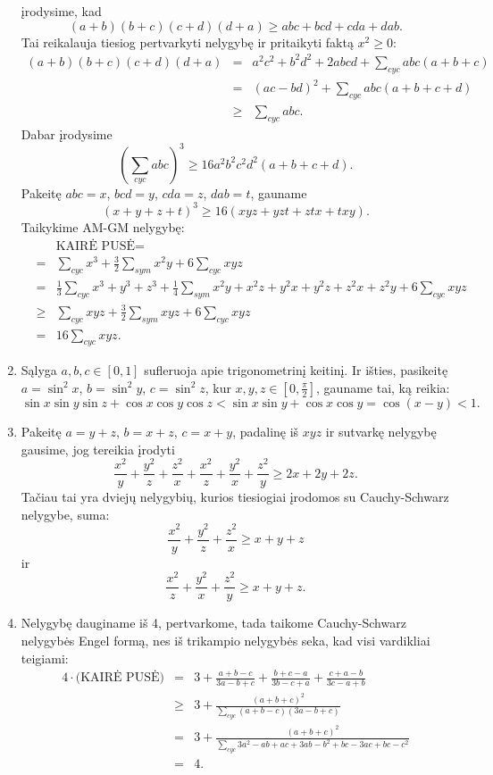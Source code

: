 \begin{enumerate}
įrodysime, kad $$(a+b)(b+c)(c+d)(d+a)\geq abc+bcd+cda+dab.$$ Tai
reikalauja tiesiog pertvarkyti nelygybę ir pritaikyti faktą
$x^2\geq0$:
\begin{eqnarray*}(a+b)(b+c)(c+d)(d+a)&=&a^2c^2+b^2d^2+2abcd+\sum_{cyc}{abc(a+b+c)}\\
&=&(ac-bd)^2+\sum_{cyc}{abc(a+b+c+d)}\\&\geq&\sum_{cyc}{abc}.\end{eqnarray*}
Dabar įrodysime
$$\left(\sum_{cyc}{abc}\right)^3\geq16a^2b^2c^2d^2(a+b+c+d).$$ Pakeitę
$abc=x$, $bcd=y$, $cda=z$, $dab=t$, gauname
$$(x+y+z+t)^3\geq16(xyz+yzt+ztx+txy).$$ Taikykime AM-GM nelygybę: \begin{eqnarray*}&&\text{KAIRĖ
PUSĖ}=\\&=&\sum_{cyc}{x^3}+\frac{3}{2}\sum_{sym}{x^2y}+6\sum_{cyc}{xyz}\\
&=&\frac{1}{3}\sum_{cyc}{x^3+y^3+z^3}+\frac{1}{4}\sum_{sym}{x^2y+x^2z+y^2x+y^2z+z^2x+z^2y}+6\sum_{cyc}{xyz}\\
&\geq&\sum_{cyc}{xyz}+\frac{3}{2}\sum_{sym}{xyz}+6\sum_{cyc}{xyz}\\&=&16\sum_{cyc}{xyz}.\end{eqnarray*}
\item 
Sąlyga $a,b,c\in[0,1]$ sufleruoja apie trigonometrinį keitinį. Ir
išties, pasikeitę $a=\sin^2x$, $b=\sin^2y$, $c=\sin^2z$, kur
$x,y,z\in[0,\frac{\pi}{2}]$, gauname tai, ką reikia: $$\sin x\sin
y\sin z+\cos x\cos y\cos z<\sin x\sin y+\cos x\cos y=\cos(x-y)<1.$$
\item 
Pakeitę $a=y+z$, $b=x+z$, $c=x+y$, padalinę iš $xyz$ ir sutvarkę
nelygybę gausime, jog tereikia įrodyti
$$\frac{x^2}{y}+\frac{y^2}{z}+\frac{z^2}{x}+\frac{x^2}{z}+\frac{y^2}{x}+\frac{z^2}{y}\geq
2x+2y+2z.$$ Tačiau tai yra dviejų nelygybių, kurios tiesiogiai
įrodomos su Cauchy-Schwarz nelygybe, suma:
$$\frac{x^2}{y}+\frac{y^2}{z}+\frac{z^2}{x}\geq x+y+z$$ ir
$$\frac{x^2}{z}+\frac{y^2}{x}+\frac{z^2}{y}\geq x+y+z.$$
\item 
Nelygybę dauginame iš 4, pertvarkome, tada taikome Cauchy-Schwarz
nelygybės Engel formą, nes iš trikampio nelygybės seka, kad visi
vardikliai teigiami: \begin{eqnarray*}4\cdot\text{(KAIRĖ
PUSĖ)}&=&3+\frac{a+b-c}{3a-b+c}+\frac{b+c-a}{3b-c+a}+\frac{c+a-b}{3c-a+b}\\
&\geq&3+\frac{(a+b+c)^2}{\sum\limits_{cyc}{(a+b-c)(3a-b+c)}}\\
&=&3+\frac{(a+b+c)^2}{\sum\limits_{cyc}{3a^2-ab+ac+3ab-b^2+bc-3ac+bc-c^2}}\\
&=&4.\end{eqnarray*}

\end{enumerate}

